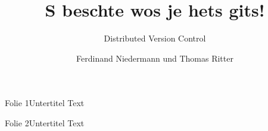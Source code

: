\documentclass[12pt,a4paper]{beamer}
\author{Ferdinand Niedermann und Thomas Ritter}
\title{S beschte wos je hets \textbf{git}s!}
\subtitle{Distributed Version Control}
\begin{document}
\maketitle


\begin{frame}{Folie 1}{Untertitel}
Text
\end{frame}

\begin{frame}{Folie 2}{Untertitel}
Text
\end{frame}
\end{document}
